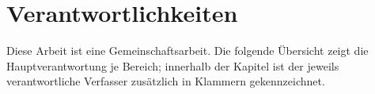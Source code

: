\documentclass[12pt,a4paper]{scrreprt}
\begin{document}

\clearpage
\chapter*{Verantwortlichkeiten}
Diese Arbeit ist eine Gemeinschaftsarbeit. Die folgende Übersicht zeigt die Hauptverantwortung je Bereich; innerhalb der Kapitel ist der jeweils verantwortliche Verfasser zusätzlich in Klammern gekennzeichnet.
\end{document}
